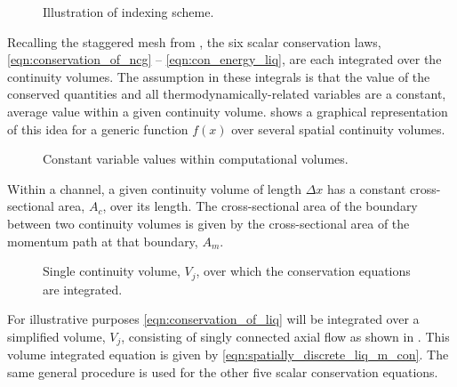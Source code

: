 \begin{figure}[ht!]
\centering

\caption{Illustration of indexing scheme.}
\label{fig:vertical_pipe_with_cells}
\end{figure}

Recalling the staggered mesh from , the six scalar conservation laws, \eqref{eqn:conservation_of_ncg} -- \eqref{eqn:con_energy_liq}, are each integrated over the continuity volumes.
The assumption in these integrals is that the value of the conserved quantities and all thermodynamically-related variables are a constant, average value within a given continuity volume.
 shows a graphical representation of this idea for a generic function $f(x)$ over several spatial continuity volumes. 

\begin{figure}[ht!]
\centering

\caption{Constant variable values within computational volumes.}
\label{fig:constant_value}
\end{figure}

Within a channel, a given continuity volume of length $\Delta x $ has a constant cross-sectional area, $A_{c}$, over its length.
The cross-sectional area of the boundary between two continuity volumes is given by the cross-sectional area of the momentum path at that boundary, $A_{m}$.

\begin{figure}[ht!]
\centering

\caption{Single continuity volume, $V_{j}$, over which the conservation equations are integrated.}
\label{fig:single_volume}
\end{figure}

For illustrative purposes \eqref{eqn:conservation_of_liq} will be integrated over a simplified volume, $V_j$, consisting of singly connected axial flow as shown in .
This volume integrated equation is given by \eqref{eqn:spatially_discrete_liq_m_con}.
The same general procedure is used for the other five scalar conservation equations.


